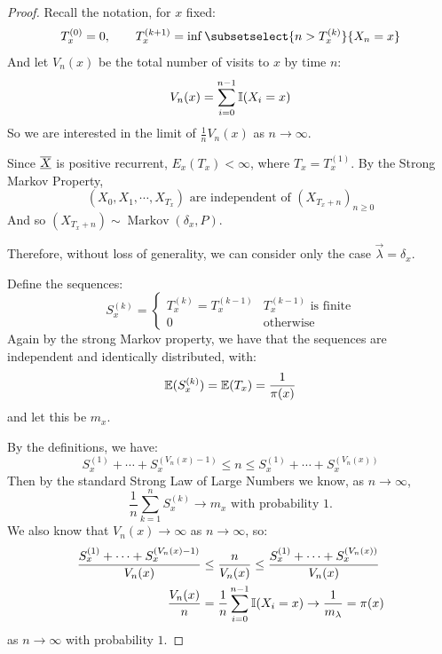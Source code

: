 \documentclass[../Main.tex]{subfiles}
\begin{document}
\begin{proof}
    Recall the notation, for $x$ fixed:
    \begin{equation*}
        T_x^{(0)} = 0,\qquad T_x^{(k+1)} = \inf\subsetselect{n > T_x^{(k)}}{X_n = x}
    \end{equation*}
    And let $V_n(x)$ be the total number of visits to $x$ by time $n$:
    \begin{equation*}
        V_n(x) = \sum_{i=0}^{n-1} \mathbb{I}(X_i = x)
    \end{equation*}
    So we are interested in the limit of $\frac1n V_n(x)$ as $n \to \infty$.

    Since $\underline{\overline{X}}$ is positive recurrent, $E_x(T_x) < \infty$, where $T_x = T_x^{(1)}$. By the Strong Markov Property, 
    \begin{equation*}
        (X_0, X_1, \cdots, X_{T_x}) \text{ are independent of } (X_{T_x + n})_{n \geq 0}
    \end{equation*}
    And so $(X_{T_x + n}) \sim \operatorname{Markov}(\delta_x, P)$.

    Therefore, without loss of generality, we can consider only the case $\vec{\lambda} = \delta_x$.

    Define the sequences:
    \begin{equation*}
        S_x^{(k)} =
        \begin{cases}
            T_x^{(k)} = T_x^{(k-1)} & T_x^{(k-1)} \text{ is finite} \\
            0 & \text{otherwise}
        \end{cases}
    \end{equation*}
    Again by the strong Markov property, we have that the sequences are independent and identically distributed, with:
    \begin{equation*}
        \mathbb{E}(S_x^{(k)}) = \mathbb{E}(T_x) = \frac1{\pi(x)}
    \end{equation*}
    and let this be $m_x$.

    By the definitions, %
    we have:
    \begin{equation*}
        S_x^{(1)} + \cdots + S_x^{(V_n(x) - 1)} \leq n \leq S_x^{(1)} + \cdots + S_x^{(V_n(x))}
    \end{equation*}
    Then by the standard Strong Law of Large Numbers we know, as $n \to \infty$,
    \begin{equation*}
        \frac1n \sum_{k=1}^{n} S_x^{(k)} \to m_x \text{ with probability $1$.}
    \end{equation*}
    We also know that $V_n(x) \to \infty$ as $n \to \infty$, so:
    \begin{align*}
        \frac{S_x^{(1)} + \cdots + S_x^{(V_n(x) - 1)}}{V_n(x)} &\leq \frac{n}{V_n(x)} \leq \frac{S_x^{(1)} + \cdots + S_x^{(V_n(x))}}{V_n(x)} \\
        \frac{V_n(x)}{n} &= \frac{1}{n} \sum_{i=0 }^{n-1} \mathbb{I}(X_i = x) \to \frac{1}{m_\lambda} = \pi(x)
    \end{align*}
    as $n \to \infty$ with probability $1$.
\end{proof}
\end{document}
